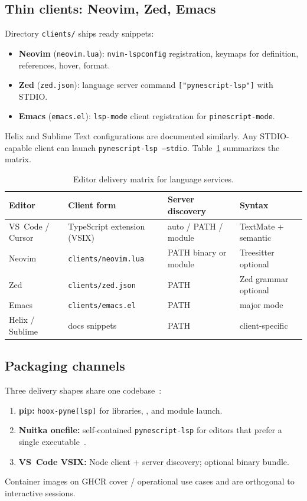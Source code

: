 \documentclass[11pt,a4paper]{article}
\begin{document}
\subsection{Thin clients: Neovim, Zed, Emacs}
\label{sec:thin}

Directory \texttt{clients/} ships ready snippets:
\begin{itemize}[leftmargin=*]
  \item \textbf{Neovim} (\texttt{neovim.lua}): \texttt{nvim-lspconfig} registration,
        keymaps for definition, references, hover, format.
  \item \textbf{Zed} (\texttt{zed.json}): language server command
        \texttt{["pynescript-lsp"]} with STDIO.
  \item \textbf{Emacs} (\texttt{emacs.el}): \texttt{lsp-mode} client registration for
        \texttt{pinescript-mode}.
\end{itemize}
Helix and Sublime Text configurations are documented similarly. Any STDIO-capable
client can launch \texttt{pynescript-lsp --stdio}. Table~\ref{tab:editors} summarizes
the matrix.

\begin{table}[t]
\centering
\caption{Editor delivery matrix for \pyne{} language services.}
\label{tab:editors}
\small
\begin{tabular}{@{}llll@{}}
\toprule
Editor & Client form & Server discovery & Syntax \\
\midrule
VS~Code / Cursor & TypeScript extension (VSIX) & auto / PATH / module & TextMate + semantic \\
Neovim & \texttt{clients/neovim.lua} & PATH binary or module & Treesitter optional \\
Zed & \texttt{clients/zed.json} & PATH & Zed grammar optional \\
Emacs & \texttt{clients/emacs.el} & PATH & major mode \\
Helix / Sublime & docs snippets & PATH & client-specific \\
\bottomrule
\end{tabular}
\end{table}

\subsection{Packaging channels}
\label{sec:packaging}

Three delivery shapes share one codebase~\citep{pynescript2026}:
\begin{enumerate}[leftmargin=*]
  \item \textbf{pip:} \texttt{hoox-pyne[lsp]} for libraries, \cli{}, and module launch.
  \item \textbf{Nuitka onefile:} self-contained \texttt{pynescript-lsp} for editors that
        prefer a single executable~\citep{nuitka}.
  \item \textbf{VS~Code VSIX:} Node client + server discovery; optional binary bundle.
\end{enumerate}
Container images on GHCR cover \cli{}/\api{} operational use cases and are orthogonal
to interactive \lsp{} sessions.
\end{document}
